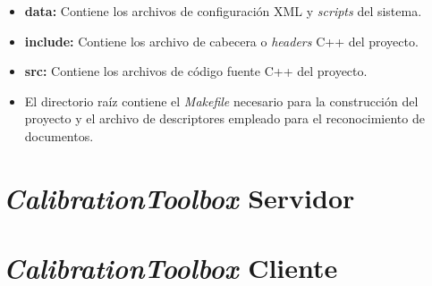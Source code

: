 \begin{itemize}
\item \textbf{data:} Contiene los archivos de configuración \acs{XML} y \textit{scripts} del sistema.
\item \textbf{include:} Contiene los archivo de cabecera o \textit{headers} C++ del proyecto.
\item \textbf{src:} Contiene los archivos de código fuente C++ del proyecto.
\item El directorio raíz contiene el \textit{Makefile} necesario para la construcción del proyecto y
  el archivo de descriptores empleado para el reconocimiento de documentos.
\end{itemize}

\section{\textit{CalibrationToolbox} Servidor}

\section{\textit{CalibrationToolbox} Cliente}




